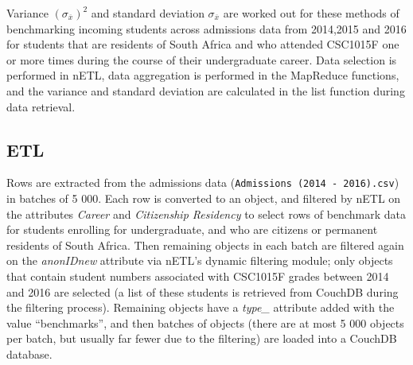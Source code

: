 Variance $(\sigma_{\overline{x}})^{2}$ and standard deviation $\sigma_{\overline{x}}$ are worked out for these methods of benchmarking incoming students across admissions data from 2014,2015 and 2016 for students that are residents of South Africa and who attended CSC1015F one or more times during the course of their undergraduate career. Data selection is performed in nETL, data aggregation is performed in the MapReduce functions, and the variance and standard deviation are calculated in the list function during data retrieval.

\subsection{ETL}
Rows are extracted from the admissions data (\texttt{Admissions (2014 - 2016).csv}) in batches of 5 000. Each row is converted to an object, and filtered by nETL on the attributes \textit{Career} and \textit{Citizenship Residency} to select rows of benchmark data for students enrolling for undergraduate, and who are citizens or permanent residents of South Africa. Then remaining objects in each batch are filtered again on the \textit{anonIDnew} attribute via nETL's dynamic filtering module; only objects that contain student numbers associated with CSC1015F grades between 2014 and 2016 are selected (a list of these students is retrieved from CouchDB during the filtering process). Remaining objects have a \textit{type\_} attribute added with the value ``benchmarks'', and then batches of objects (there are at most 5 000 objects per batch, but usually far fewer due to the filtering) are loaded into a CouchDB database.

